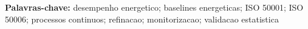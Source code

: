 

\bigskip
\noindent\textbf{Palavras-chave:} desempenho energetico; baselines energeticas; ISO 50001; ISO 50006; processos continuos; refinacao; monitorizacao; validacao estatistica
